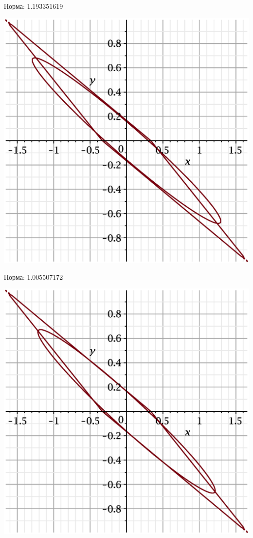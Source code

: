\documentclass{beamer}
\begin{document}
\begin{frame}
Норма: 1.193351619
    \begin{center}
        \includegraphics[scale=0.4]{pictures/6.eps}
    \end{center}
\end{frame}

\begin{frame}
Норма: 1.005507172
    \begin{center}
        \includegraphics[scale=0.4]{pictures/7.eps}
    \end{center}
\end{frame}
\end{document}
